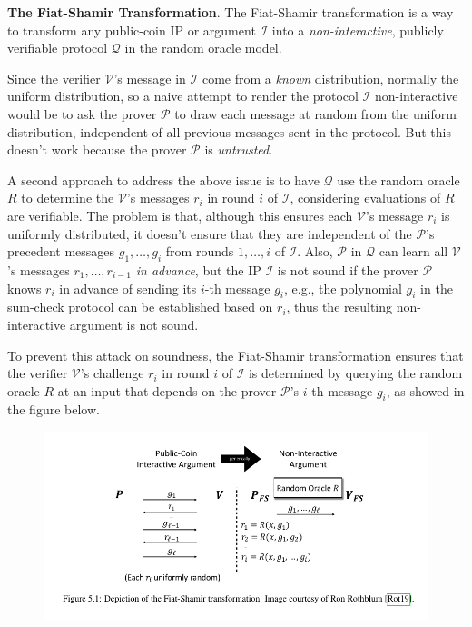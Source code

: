 \documentclass{article}
\begin{document}
\textbf{The Fiat-Shamir Transformation}. The Fiat-Shamir transformation is a way to transform any public-coin IP or argument $\mathcal{I}$ into a \textit{non-interactive}, publicly verifiable protocol $\mathcal{Q}$ in the random oracle model. 

Since the verifier $\mathcal{V}$'s message in $\mathcal{I}$ come from a \textit{known} distribution, normally the uniform distribution, so a naive attempt to render the protocol $\mathcal{I}$ non-interactive would be to ask the prover $\mathcal{P}$ to draw each message at random from the uniform distribution, independent of all previous messages sent in the protocol. But this doesn't work because the prover $\mathcal{P}$ is \textit{untrusted}. 

A second approach to address the above issue is to have $\mathcal{Q}$ use the random oracle $R$ to determine the $\mathcal{V}$'s messages $r_i$ in round $i$ of $\mathcal{I}$, considering evaluations of $R$ are verifiable. The problem is that, although this ensures each $\mathcal{V}$'s message $r_i$ is uniformly distributed, it doesn't ensure that they are independent of the $\mathcal{P}$'s precedent messages $g_1, \dots, g_{i}$ from rounds $1, \dots, i$ of $\mathcal{I}$. Also, $\mathcal{P}$ in $\mathcal{Q}$ can learn all $\mathcal{V}$'s messages $r_1, \dots, r_{i-1}$ \textit{in advance}, but the IP $\mathcal{I}$ is not sound if the prover $\mathcal{P}$ knows $r_i$ in advance of sending its $i$-th message $g_i$, e.g., the polynomial $g_i$ in the sum-check protocol can be established based on $r_i$, thus the resulting non-interactive argument is not sound. 


To prevent this attack on soundness, the Fiat-Shamir transformation ensures that the verifier $\mathcal{V}$'s challenge $r_i$ in round $i$ of $\mathcal{I}$ is determined by querying the random oracle $R$ at an input that depends on the prover $\mathcal{P}$'s $i$-th message $g_i$, as showed in the figure below.

\begin{figure}[H]
\centering
\includegraphics[scale=0.5]{fiat-shamir}
\end{figure}
\end{document}
